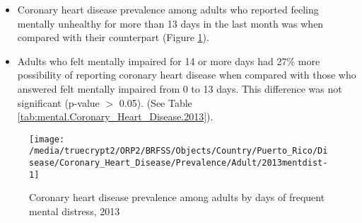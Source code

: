  \newpage
\begin{itemize}

\item Coronary heart disease prevalence among adults who reported feeling mentally unhealthy for more than 13 days in the last month was  when compared with their counterpart (Figure \ref{fig:mental.Coronary_Heart_Disease.2013}).


\item  Adults who felt mentally impaired for 14 or more days had 27\% more possibility of reporting coronary heart disease when compared with those who answered felt mentally impaired from 0 to 13 days. This difference was not significant (p-value $>$ 0.05). (See Table \ref{tab:mental.Coronary_Heart_Disease.2013}).

\end{itemize}

\begin{figure}[H]
\centering
\caption{Coronary heart disease prevalence among adults by days of frequent mental distress, 2013}
\label{fig:mental.Coronary_Heart_Disease.2013}

\begin{knitrout}
\color{fgcolor}

{\centering \texttt{[image: /media/truecrypt2/ORP2/BRFSS/Objects/Country/Puerto\_Rico/Disease/Coronary\_Heart\_Disease/Prevalence/Adult/2013mentdist-1]} 

}



\end{knitrout}
 \end{figure}

